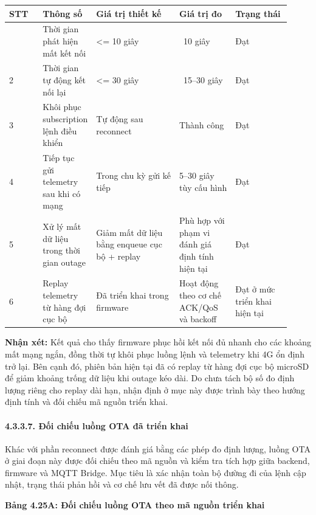 \documentclass[13pt,a4paper]{extarticle}
\newcounter{none} %
\newcommand{\thesislongtableorignewline}{}
\let\thesislongtableorignewline\\
\renewcommand{\\}{\thesislongtableorignewline\hline}%
\let\\\thesislongtableorignewline
\newcommand{\thesistabletitle}[1]{%
  \begin{center}\textbf{#1}\end{center}%
}
\begin{document}
{\def\LTcaptype{none} %
\begin{longtable}{|p{0.12\linewidth}|p{0.10\linewidth}|p{0.30\linewidth}|p{0.20\linewidth}|p{0.20\linewidth}|}
\hline \textbf{STT} & \textbf{Thông số} & \textbf{Giá trị thiết kế} & \textbf{Giá trị đo} & \textbf{Trạng thái} \\
\hline
\endhead
\hline
\endlastfoot
1 & Thời gian phát hiện mất kết nối & \textless= 10 giây &
~10 giây & Đạt \\
2 & Thời gian tự động kết nối lại & \textless= 30 giây &
~15--30 giây & Đạt \\
3 & Khôi phục subscription lệnh điều khiển & Tự động sau reconnect &
Thành công & Đạt \\
4 & Tiếp tục gửi telemetry sau khi có mạng & Trong chu kỳ gửi kế tiếp &
5--30 giây tùy cấu hình & Đạt \\
5 & Xử lý mất dữ liệu trong thời gian outage & Giảm mất dữ liệu bằng
enqueue cục bộ + replay & Phù hợp với phạm vi đánh giá định tính hiện
tại & Đạt \\
6 & Replay telemetry từ hàng đợi cục bộ & Đã triển khai trong firmware &
Hoạt động theo cơ chế ACK/QoS và backoff & Đạt ở mức triển khai hiện
tại \\
\end{longtable}
}

\textbf{Nhận xét:} Kết quả cho thấy firmware phục hồi kết nối đủ nhanh
cho các khoảng mất mạng ngắn, đồng thời tự khôi phục luồng lệnh và
telemetry khi 4G ổn định trở lại. Bên cạnh đó, phiên bản hiện tại đã có
replay từ hàng đợi cục bộ microSD để giảm khoảng trống dữ liệu khi
outage kéo dài. Do chưa tách bộ số đo định lượng riêng cho replay dài
hạn, nhận định ở mục này được trình bày theo hướng định tính và đối
chiếu mã nguồn triển khai.

\paragraph{4.3.3.7. Đối chiếu luồng OTA đã triển
khai}\label{4337-ux111ux1ed1i-chiux1ebfu-luux1ed3ng-ota-ux111uxe3-triux1ec3n-khai}

Khác với phần reconnect được đánh giá bằng các phép đo định lượng, luồng
OTA ở giai đoạn này được đối chiếu theo mã nguồn và kiểm tra tích hợp
giữa backend, firmware và MQTT Bridge. Mục tiêu là xác nhận toàn bộ
đường đi của lệnh cập nhật, trạng thái phản hồi và cơ chế lưu vết đã
được nối thông.

\thesistabletitle{Bảng 4.25A: Đối chiếu luồng OTA theo mã nguồn triển khai}
\end{document}
